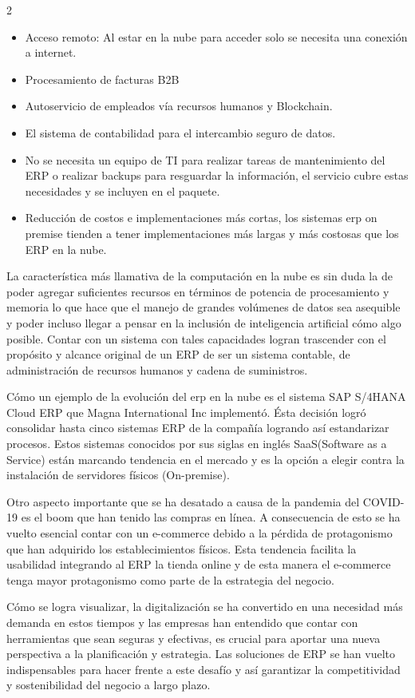 \documentclass[12pt,spanish,Letterpaper,openany]{book}
\begin{document}
\begin {multicols}{2}
\begin{itemize}
\item
  Acceso remoto: Al estar en la nube para acceder solo se necesita una conexión a
  internet.
\item
  Procesamiento de facturas B2B
\item
  Autoservicio de empleados vía recursos humanos y Blockchain.
\item
  El sistema de contabilidad para el intercambio seguro de datos.
\item
  No se necesita un equipo de TI para realizar tareas de mantenimiento del ERP o
  realizar backups para resguardar la información, el servicio cubre estas necesidades y
  se incluyen en el paquete.
\item
  Reducción de costos e implementaciones más cortas, los sistemas erp on premise
  tienden a tener implementaciones más largas y más costosas que los ERP en la nube.
\end{itemize}

La característica más llamativa de la computación en la nube es sin duda la de poder agregar
suficientes recursos en términos de potencia de procesamiento y memoria lo que hace que el
manejo de grandes volúmenes de datos sea asequible y poder incluso llegar a pensar en la
inclusión de inteligencia artificial cómo algo posible. Contar con un sistema con tales
capacidades logran trascender con el propósito y alcance original de un ERP de ser un
sistema contable, de administración de recursos humanos y cadena de suministros.

Cómo un ejemplo de la evolución del erp en la nube es el sistema SAP S/4HANA
Cloud ERP que Magna International Inc implementó. Ésta decisión logró consolidar hasta
cinco sistemas ERP de la compañía logrando así estandarizar procesos. Estos sistemas
conocidos por sus siglas en inglés SaaS(Software as a Service) están marcando tendencia en
el mercado y es la opción a elegir contra la instalación de servidores físicos (On-premise).

Otro aspecto importante que se ha desatado a causa de la pandemia del COVID-19 es el boom
que han tenido las compras en línea. A consecuencia de esto se ha vuelto esencial contar con
un e-commerce debido a la pérdida de protagonismo que han adquirido los establecimientos
físicos. Esta tendencia facilita la usabilidad integrando al ERP la tienda online y de esta
manera el e-commerce tenga mayor protagonismo como parte de la estrategia del negocio.

Cómo se logra visualizar, la digitalización se ha convertido en una necesidad más demanda
en estos tiempos y las empresas han entendido que contar con herramientas que sean seguras
y efectivas, es crucial para aportar una nueva perspectiva a la planificación y estrategia. Las
soluciones de ERP se han vuelto indispensables para hacer frente a este desafío y así
garantizar la competitividad y sostenibilidad del negocio a largo plazo.


\end{multicols}
\end{document}
